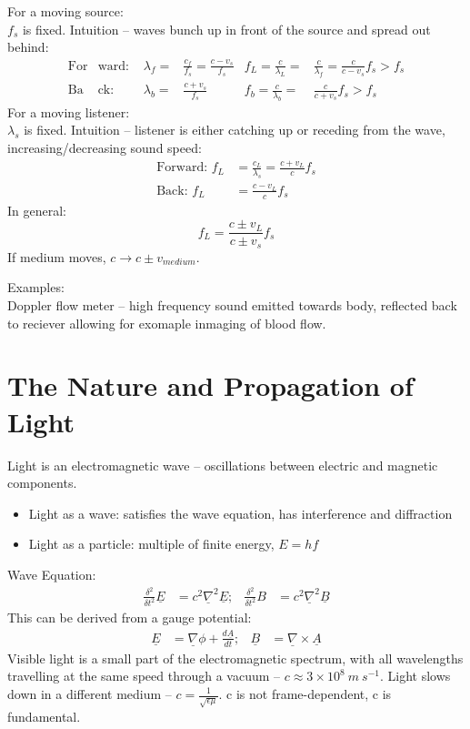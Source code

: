 \documentclass[a4paper, 11pt, normalem]{report}
\begin{document}
For a moving source: \\
$f_{s}$ is fixed.
Intuition -- waves bunch up in front of the source and spread out behind:
\begin{align}
    \text{For}&\text{ward: } & \lambda_{f} =& \frac{c_{f}}{f_{s}} = \frac{c - v_{s}}{f_{s}} & f_{L} = \frac{c}{\lambda_{L}} =& \frac{c}{\lambda_{f}} = \frac{c}{c - v_{s}}f_{s} > f_{s} \\
    \text{Ba}&\text{ck: } & \lambda_{b} =& \frac{c + v_{s}}{f_{s}} & f_{b} = \frac{c}{\lambda_{b}} =& \frac{c}{c + v_{s}}f_{s} > f_{s}
\end{align}
For a moving listener: \\
$\lambda_{s}$ is fixed.
Intuition -- listener is either catching up or receding from the wave, increasing/decreasing sound speed:
\begin{align}
    \text{Forward: } f_{L} &= \frac{c_{L}}{\lambda_{s}} = \frac{c + v_{L}}{c}f_{s} \\
    \text{Back: } f_{L} &= \frac{c - v_{L}}{c}f_{s}
\end{align}
In general:
\begin{equation}
    f_{L} = \frac{c \pm v_{L}}{c \pm v_{s}}f_{s}
\end{equation}
If medium moves, $c \rightarrow c \pm v_{medium}$.

Examples: \\
Doppler flow meter -- high frequency sound emitted towards body, reflected back to reciever allowing for exomaple inmaging of blood flow.

\section{The Nature and Propagation of Light}
Light is an electromagnetic wave -- oscillations between electric and magnetic components.
\begin{itemize}
    \item Light as a wave: satisfies the wave equation, has interference and diffraction
    \item Light as a particle: multiple of finite energy, $E = hf$
\end{itemize}
Wave Equation:
\begin{align}
    \frac{\delta^{2}}{\delta t^{2}}\underline{E} &= c^{2}\underline{\nabla}^{2}\underline{E};& \frac{\delta^{2}}{\delta t^{2}}B &= c^{2}\underline{\nabla}^{2}\underline{B}
\end{align}
This can be derived from a gauge potential:
\begin{align}
    \underline{E} &= \underline{\nabla}\phi + \frac{d\underline{A}}{dt};& \underline{B} &= \underline{\nabla}\times\underline{A}
\end{align}
Visible light is a small part of the electromagnetic spectrum, with all wavelengths travelling at the same speed through a vacuum -- $c \approx 3\times10^{8}\:m\:s^{-1}$.
Light slows down in a different medium -- $c = \frac{1}{\sqrt{\epsilon\mu}}$.
c is not frame-dependent, c is fundamental.
\end{document}
